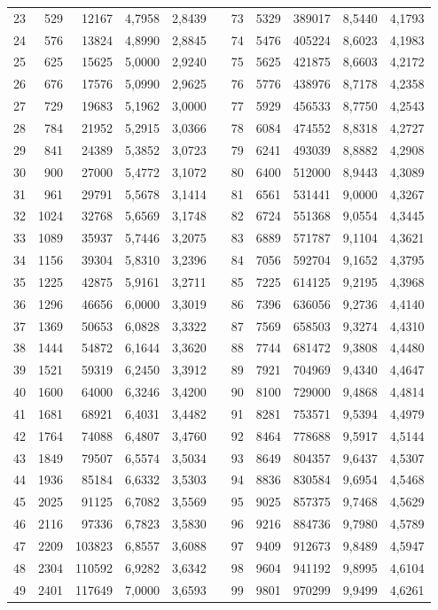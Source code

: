 \begin{longtable}{rrrrrrrrrrr}
23&529&12167&4,7958&2,8439&&73&5329&389017&8,5440&4,1793\\
24&576&13824&4,8990&2,8845&&74&5476&405224&8,6023&4,1983\\
25&625&15625&5,0000&2,9240&&75&5625&421875&8,6603&4,2172\\
26&676&17576&5,0990&2,9625&&76&5776&438976&8,7178&4,2358\\
27&729&19683&5,1962&3,0000&&77&5929&456533&8,7750&4,2543\\
28&784&21952&5,2915&3,0366&&78&6084&474552&8,8318&4,2727\\
29&841&24389&5,3852&3,0723&&79&6241&493039&8,8882&4,2908\\
30&900&27000&5,4772&3,1072&&80&6400&512000&8,9443&4,3089\\
31&961&29791&5,5678&3,1414&&81&6561&531441&9,0000&4,3267\\
32&1024&32768&5,6569&3,1748&&82&6724&551368&9,0554&4,3445\\
33&1089&35937&5,7446&3,2075&&83&6889&571787&9,1104&4,3621\\
34&1156&39304&5,8310&3,2396&&84&7056&592704&9,1652&4,3795\\
35&1225&42875&5,9161&3,2711&&85&7225&614125&9,2195&4,3968\\
36&1296&46656&6,0000&3,3019&&86&7396&636056&9,2736&4,4140\\
37&1369&50653&6,0828&3,3322&&87&7569&658503&9,3274&4,4310\\
38&1444&54872&6,1644&3,3620&&88&7744&681472&9,3808&4,4480\\
39&1521&59319&6,2450&3,3912&&89&7921&704969&9,4340&4,4647\\
40&1600&64000&6,3246&3,4200&&90&8100&729000&9,4868&4,4814\\
41&1681&68921&6,4031&3,4482&&91&8281&753571&9,5394&4,4979\\
42&1764&74088&6,4807&3,4760&&92&8464&778688&9,5917&4,5144\\
43&1849&79507&6,5574&3,5034&&93&8649&804357&9,6437&4,5307\\
44&1936&85184&6,6332&3,5303&&94&8836&830584&9,6954&4,5468\\
45&2025&91125&6,7082&3,5569&&95&9025&857375&9,7468&4,5629\\
46&2116&97336&6,7823&3,5830&&96&9216&884736&9,7980&4,5789\\
47&2209&103823&6,8557&3,6088&&97&9409&912673&9,8489&4,5947\\
48&2304&110592&6,9282&3,6342&&98&9604&941192&9,8995&4,6104\\
49&2401&117649&7,0000&3,6593&&99&9801&970299&9,9499&4,6261\\

\end{longtable}
